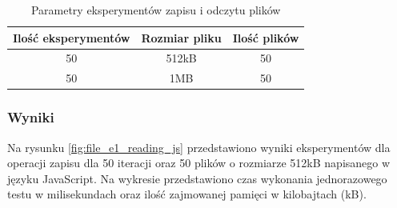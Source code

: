 \begin{table}[H]
  \centering
  \caption{Parametry eksperymentów zapisu i odczytu plików}
  \begin{tabular}{|c|c|c|}
    \hline
    \textbf{Ilość eksperymentów} & \textbf{Rozmiar pliku} & \textbf{Ilość plików} \\ \hline
    50 & 512kB & 50 \\ \hline
    50 & 1MB & 50 \\ \hline
  \end{tabular}
  \label{tab:file_experiments}
\end{table}

\subsubsection{Wyniki}
Na rysunku \ref{fig:file_e1_reading_js} przedstawiono wyniki eksperymentów dla operacji zapisu dla 50 iteracji oraz 50 plików o rozmiarze 512kB napisanego w języku JavaScript. Na wykresie przedstawiono czas wykonania jednorazowego testu w milisekundach oraz ilość zajmowanej pamięci w kilobajtach (kB).

